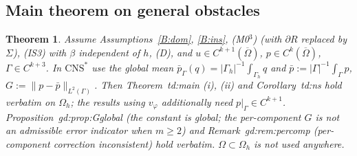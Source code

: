 \documentclass[11pt]{article}
\newtheorem{theorem}{Theorem}[section]
\theoremstyle{definition}
\newcommand{\Gh}{\Gamma_h}
\newcommand{\Oh}{\Omega_h}
\newcommand{\pbar}{\bar p}
\newcommand{\pbG}{\bar p_{\Gamma}}
\newcommand{\norm}[1]{\lVert #1\rVert}
\newcommand{\CNS}{\mathrm{CNS}^\ast}
\begin{document}
\subsection{Main theorem on general obstacles}
\begin{theorem}\label{B:main}
Assume Assumptions~\ref{B:dom}, \ref{B:ins}, (M0$^3$) (with $\partial R$ replaced by $\Sigma$), (IS3) with $\beta$ independent of $h$, (D), and $u\in C^{k+1}(\overline\Omega)$, $p\in C^k(\overline\Omega)$, $\Gamma\in C^{k+3}$. In $\CNS$ use the global mean $\pbG(q)=|\Gh|^{-1}\int_{\Gh}q$ and $\pbar:=|\Gamma|^{-1}\int_\Gamma p$, $G:=\norm{p-\pbar}_{L^2(\Gamma)}$. Then Theorem~td:main (i), (ii) and Corollary~td:ns hold verbatim on $\Oh$; the results using $v_\varphi$ additionally need $p|_\Gamma\in C^{k+1}$. Proposition~gd:prop:Gglobal (the constant is global; the per-component $G$ is not an admissible error indicator when $m\ge2$) and Remark~gd:rem:percomp (per-component correction inconsistent) hold verbatim. $\Omega\subset\Oh$ is not used anywhere.
\end{theorem}
\end{document}
